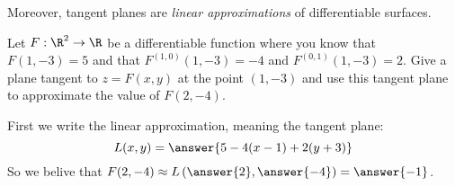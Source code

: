 \documentclass{ximera}
\begin{document}
Moreover, tangent planes are \textit{linear approximations} of
differentiable surfaces. 


\begin{question}
  Let $F:\R^2\to\R$ be a differentiable function where you know that
  $F(1,-3) = 5$ and that $F^{(1,0)}(1,-3) = -4$ and $F^{(0,1)}(1,-3) = 2$. Give a plane
  tangent to $z =F(x,y)$ at the point $(1,-3)$ and use this tangent
  plane to approximate the value of $F(2,-4)$.
  \begin{prompt}
    First we write the linear approximation, meaning the tangent plane:
    \[
    L(x,y) = \answer{5 -4(x-1) + 2(y+3)}
    \]
    So we belive that $F(2,-4) \approx L\left(\answer{2},\answer{-4}\right) =
    \answer{-1}$.
  \end{prompt}
\end{question}
\end{document}
